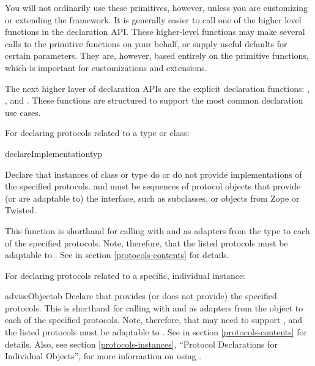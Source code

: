 \begin{verbatim%
}
\begin{verbatim%
}
\begin{verbatim%
}
\begin{verbatim%
}
\begin{verbatim%
}
\begin{verbatim%
}
You will not ordinarily use these primitives, however, unless you are
customizing or extending the framework.  It is generally easier to call one
of the higher level functions in the declaration API.  These higher-level
functions may make several calls to the primitive functions on your behalf, or
supply useful defaults for certain parameters.  They are, however, based
entirely on the primitive functions, which is important for customizations and
extensions.

The next higher layer of declaration APIs are the explicit declaration
functions: , , and
.  These functions are structured to support the most
common declaration use cases.

For declaring protocols related to a type or class:

\begin{funcdesc}{declareImplementation}{typ
 }

Declare that instances of class or type  do or do not provide
implementations of the specified protocols.   and
 must be sequences of protocol objects that
provide (or are adaptable to) the  interface,
such as  subclasses, or  objects
from Zope or Twisted.

This function is shorthand for calling 
with  and  as adapters
from the type to each of the specified protocols.  Note, therefore, that the
listed protocols must be adaptable to .  See
 in section \ref{protocols-contents} for
details.
\end{funcdesc}


For declaring protocols related to a specific, individual instance:

\begin{funcdesc}{adviseObject}{ob
 }
Declare that  provides (or does not provide) the specified protocols.
This is shorthand for calling 
with  and  as adapters
from the object to each of the specified protocols.  Note, therefore, that
 may need to support , and the listed protocols
must be adaptable to .  See
 in section \ref{protocols-contents} for
details.  Also, see section \ref{protocols-instances}, ``Protocol Declarations
for Individual Objects'', for more information on using
.
\end{funcdesc}






\end{verbatim%
}
\end{verbatim%
}
\end{verbatim%
}
\end{verbatim%
}
\end{verbatim%
}
\end{verbatim%
}
